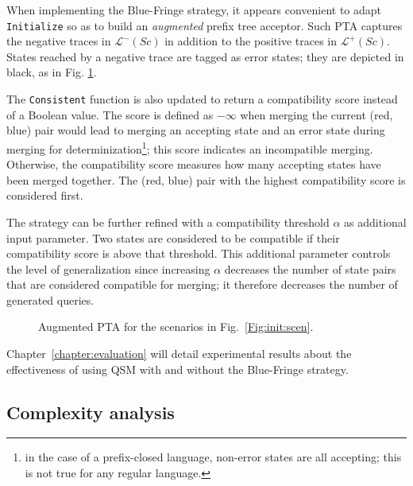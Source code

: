 When implementing the Blue-Fringe strategy, it appears convenient to adapt \texttt{Initialize} so as to build an \emph{augmented} prefix tree acceptor. Such PTA captures the negative traces in $\mathcal{L}^-(Sc)$ in addition to the positive traces in $\mathcal{L}^+(Sc)$. States reached by a negative trace are tagged as error states; they are depicted in black, as in Fig. \ref{figure:augmented-pta}. 

The \texttt{Consistent} function is also updated to return a compatibility score instead of a Boolean value. The score is defined as $-\infty$ when merging the current (red, blue) pair would lead to merging an accepting state and an error state during merging for determinization\footnote{in the case of a prefix-closed language, non-error states are all accepting; this is not true for any regular language.}; this score indicates an incompatible merging. Otherwise, the compatibility score measures how many accepting states have been merged together. The (red, blue) pair with the highest compatibility score is considered first. 

The strategy can be further refined with a compatibility threshold $\alpha$ as additional input parameter. Two states are considered to be compatible if their compatibility score is above that threshold. This additional parameter controls the level of generalization since increasing $\alpha$ decreases the number of state pairs that are considered compatible for merging; it therefore decreases the number of generated queries.

\begin{figure}\centering
{}
\caption[Augmented PTA]{Augmented PTA for the scenarios in Fig.~\ref{Fig:init:scen}\label{figure:augmented-pta}.}
\end{figure}

Chapter~\ref{chapter:evaluation} will detail experimental results about the effectiveness of using QSM with and without the Blue-Fringe strategy.

\subsection{Complexity analysis\label{subsection:qsm-complexity-analysis}}

